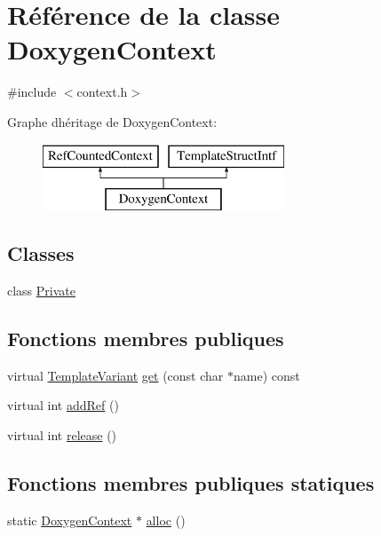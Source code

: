 \hypertarget{class_doxygen_context}{}\section{Référence de la classe Doxygen\+Context}
\label{class_doxygen_context}


{\ttfamily \#include $<$context.\+h$>$}

Graphe d\textquotesingle{}héritage de Doxygen\+Context\+:\begin{figure}[H]
\begin{center}
\leavevmode
\includegraphics[height=2.000000cm]{class_doxygen_context}
\end{center}
\end{figure}
\subsection*{Classes}
\begin{DoxyCompactItemize}
\item 
class \hyperlink{class_doxygen_context_1_1_private}{Private}
\end{DoxyCompactItemize}
\subsection*{Fonctions membres publiques}
\begin{DoxyCompactItemize}
\item 
virtual \hyperlink{class_template_variant}{Template\+Variant} \hyperlink{class_doxygen_context_add7977d2d189b4fdf758e5a792c5d35a}{get} (const char $\ast$name) const 
\item 
virtual int \hyperlink{class_doxygen_context_a354b9dc7833167a7028074acf11d0974}{add\+Ref} ()
\item 
virtual int \hyperlink{class_doxygen_context_a6121205533d3518b8add76e569f80d10}{release} ()
\end{DoxyCompactItemize}
\subsection*{Fonctions membres publiques statiques}
\begin{DoxyCompactItemize}
\item 
static \hyperlink{class_doxygen_context}{Doxygen\+Context} $\ast$ \hyperlink{class_doxygen_context_acfa6ea631080a61631180a1f6afbac6e}{alloc} ()
\end{DoxyCompactItemize}


